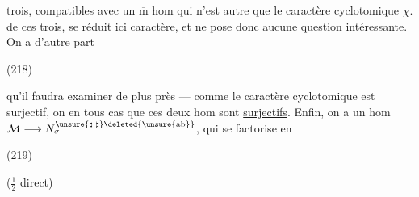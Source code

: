 
trois, compatibles avec un $\overline{\mathrm m}$ hom
qui n'est autre que le caractère cyclotomique $\chi$.
 de ces trois,
se réduit ici  caractère, et ne pose donc aucune question intéressante. On a d'autre part

\begin{samepage}
\noindent (218)\quad
{}
\end{samepage}

qu'il faudra examiner de plus près --- comme le caractère cyclotomique est  surjectif, on  en tous cas que ces deux hom sont \uline{surjectifs}. Enfin, on a un hom
$\mathcal M\longrightarrow N_{\sigma}^{\unsure{\natural|\sharp}\deleted{\unsure{\mathrm{ab}}}}$, qui se factorise en

\begin{samepage}
\noindent (219)\quad
{}
\end{samepage}
\hfill ($\frac12$ direct)

